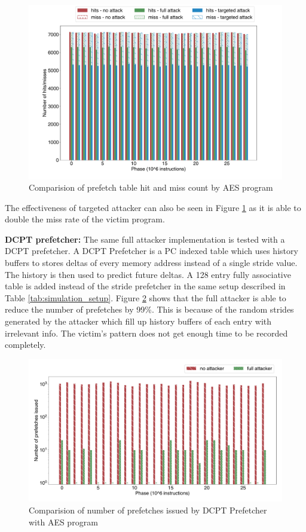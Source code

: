 \documentclass[conference]{IEEEtran}
\begin{document}
\begin{figure}[htbp]
    \centering
    \includegraphics[width=\columnwidth]{pf_hits}
    \caption{Comparision of prefetch table hit and miss count by AES program}
    \label{fig:targeted_hitrate}
\end{figure}

The effectiveness of targeted attacker can also be seen in Figure \ref{fig:targeted_hitrate}
as it is able to double the miss rate of the victim program.

\textbf{DCPT prefetcher:}
The same full attacker implementation is tested with a DCPT prefetcher.
A DCPT Prefetcher\cite{dcpt} is a PC indexed table which uses history buffers to
stores deltas of every memory address instead of a single stride value.
The history is then used to predict future deltas. A 128 entry fully associative
table is added instead of the stride prefetcher in the same setup described
in Table \ref{tab:simulation_setup}.
Figure \ref{fig:dcpt_hwpf} shows that the full attacker is able to reduce
the number of prefetches by 99\%. This is because of the random strides
generated by the attacker which fill up history buffers of each entry with
irrelevant info. The victim's pattern does not get enough time to be recorded
completely.

\begin{figure}[htbp]
    \centering
    \includegraphics[width=\columnwidth]{dcpt-hwpf}
    \caption{Comparision of number of prefetches issued by DCPT Prefetcher with AES program}
    \label{fig:dcpt_hwpf}
\end{figure}
\end{document}
